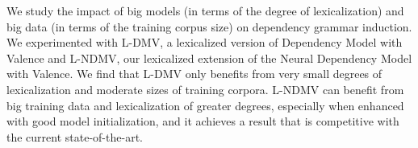 We study the impact of big models (in terms of the degree of lexicalization) and big data (in terms of the training corpus size) on dependency grammar induction. We experimented with L-DMV, a lexicalized version of Dependency Model with Valence and L-NDMV, our lexicalized extension of the Neural Dependency Model with Valence. We find that L-DMV only benefits from very small degrees of lexicalization and moderate sizes of training corpora. L-NDMV can benefit from big training data and lexicalization of greater degrees, especially when enhanced with good model initialization, and it achieves a result that is competitive with the current state-of-the-art.
